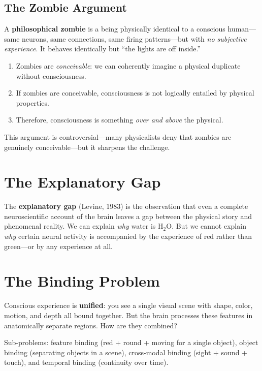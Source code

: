\documentclass[11pt,a4paper]{report}
\begin{document}
\subsection{The Zombie Argument}

\begin{conceptbox}
A \textbf{philosophical zombie} is a being physically identical to a conscious human---same neurons, same connections, same firing patterns---but with \emph{no subjective experience}. It behaves identically but ``the lights are off inside.''

\begin{enumerate}[leftmargin=1.5em]
  \item Zombies are \emph{conceivable}: we can coherently imagine a physical duplicate without consciousness.
  \item If zombies are conceivable, consciousness is not logically entailed by physical properties.
  \item Therefore, consciousness is something \emph{over and above} the physical.
\end{enumerate}
This argument is controversial---many physicalists deny that zombies are genuinely conceivable---but it sharpens the challenge.
\end{conceptbox}

\section{The Explanatory Gap}

The \textbf{explanatory gap} (Levine, 1983) is the observation that even a complete neuroscientific account of the brain leaves a gap between the physical story and phenomenal reality. We can explain \emph{why} water is H$_2$O. But we cannot explain \emph{why} certain neural activity is accompanied by the experience of red rather than green---or by any experience at all.

\section{The Binding Problem}

\begin{definitionbox}
Conscious experience is \textbf{unified}: you see a single visual scene with shape, color, motion, and depth all bound together. But the brain processes these features in anatomically separate regions. How are they combined?

Sub-problems: feature binding (red + round + moving for a single object), object binding (separating objects in a scene), cross-modal binding (sight + sound + touch), and temporal binding (continuity over time).
\end{definitionbox}
\end{document}

